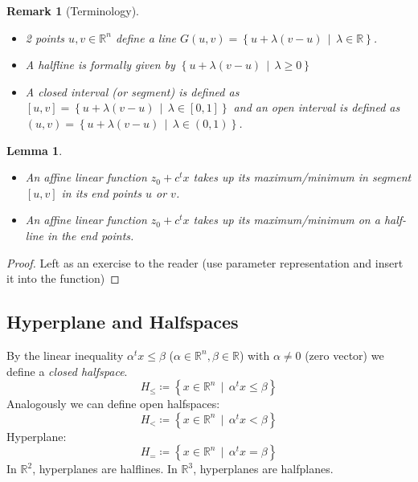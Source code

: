 \documentclass{article}
\newcounter{lecref}[section]
\numberwithin{lecref}{section}
\newtheorem{lemma}[lecref]{Lemma}
\newtheorem*{Remark}{Remark}
\newcommand{\SetDef}[2]{\left\{#1\,\mid\,#2\right\}}
\begin{document}
\begin{Remark}[Terminology] \hfill{}
  \begin{itemize}
  	\item 2 points $u, v \in \mathbb R^n$ define a \emph{line} $G(u, v) = \SetDef{u + \lambda (v - u)}{\lambda \in \mathbb R}$. 
  	\item A \emph{halfline} is formally given by $\SetDef{u + \lambda (v - u)}{\lambda \geq 0}$ 
  	\item A \emph{closed interval} (or \emph{segment}) is defined as $[u, v] = \SetDef{u + \lambda (v - u)}{\lambda \in [0, 1]}$ and
  		an \emph{open interval} is defined as $(u, v) = \SetDef{u + \lambda (v - u)}{\lambda \in (0, 1)}$. 
  \end{itemize}
\end{Remark}

\begin{lemma}
	\label{lemma:1.1}
	\begin{itemize}
		\item An affine linear function $z_0 + c^t x$ takes up its maximum/minimum in segment $[u, v]$ in its end points $u$ or $v$.
		\item An affine linear function $z_0 + c^t x$ takes up its maximum/minimum on a half-line in the end points.
	\end{itemize}
\end{lemma}
\begin{proof}
	Left as an exercise to the reader (use parameter representation and insert it into the function)
\end{proof}

\subsection{Hyperplane and Halfspaces}

By the linear inequality $\alpha^t x \leq \beta$ ($\alpha \in \mathbb R^n, \beta \in \mathbb R$) with $\alpha \neq 0$ (zero vector) we define a \emph{closed halfspace}.
\[ H_{\leq} \coloneqq \SetDef{x \in \mathbb R^n}{\alpha^t x \leq \beta} \]
Analogously we can define open halfspaces:
\[ H_{<} \coloneqq \SetDef{x \in \mathbb R^n}{\alpha^t x < \beta} \]
Hyperplane:
\[ H_{=} \coloneqq \SetDef{x \in \mathbb R^n}{\alpha^t x = \beta} \]
In $\mathbb R^2$, hyperplanes are halflines.
In $\mathbb R^3$, hyperplanes are halfplanes.
\end{document}
